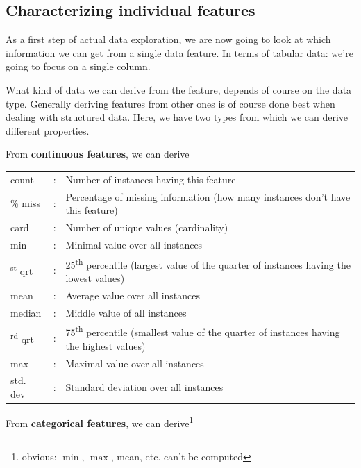 \subsection{Characterizing individual features}

As a first step of actual data exploration, we are now going to look at which information we can get from a single data feature. In terms of tabular data: we're going to focus on a single column.

What kind of data we can derive from the feature, depends of course on the data type. Generally deriving features from other ones is of course done best when dealing with structured data. Here, we have two types from which we can derive different properties.

From \textbf{continuous features}, we can derive\renewcommand{\arraystretch}{1.5}

\begin{tabular}{@{}>{\raggedleft}m{} @{}>{\color{black}\centering:}m{} @{}>{\color{black}}m{}}
  count && Number of instances having this feature \\
  \% miss && Percentage of missing information {\color{gray}\footnotesize(how many instances don't have this feature)} \\
  card && Number of unique values (cardinality) \\
  min && Minimal value over all instances \\
  1\textsuperscript{st} qrt && 25\textsuperscript{th} percentile {\color{gray}\footnotesize(largest value of the quarter of instances having the lowest values)} \\
  mean && Average value over all instances \\
  median && Middle value of all instances \\
  3\textsuperscript{rd} qrt && 75\textsuperscript{th} percentile {\color{gray}\footnotesize(smallest value of the quarter of instances having the highest values)} \\
  max && Maximal value over all instances \\
  std. dev && Standard deviation over all instances
\end{tabular}


From \textbf{categorical features}, we can derive\footnote{obvious: $\min$, $\max$, {\color{mathblue}mean}, etc. can't be computed}

